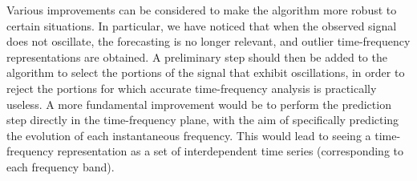\documentclass[journal]{IEEEtran}
\begin{document}
Various improvements can be considered to make the algorithm more robust to certain situations. In particular, we have noticed that when the observed signal does not oscillate, the forecasting is no longer relevant, and outlier time-frequency representations are obtained. A preliminary step should then be added to the algorithm to select the portions of the signal that exhibit oscillations, in order to reject the portions for which accurate time-frequency analysis is practically useless. A more fundamental improvement would be to perform the prediction step directly in the time-frequency plane, with the aim of specifically predicting the evolution of each instantaneous frequency. This would lead to seeing a time-frequency representation as a set of interdependent time series (corresponding to each frequency band).

%





%
\end{document}
